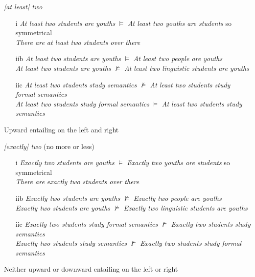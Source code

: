 \documentclass[a4paper]{article}
\begin{document}
\begin{enumerate}
\begin{exe}
    \ex \textit{{[at least]} two}
   \begin{itemize}
    \item[i] \textit{At least two students are youths} $\models$
      \textit{At least two youths are students} so symmetrical
      \\ \textit{There are at least two students over there}
    \item[iib] \textit{At least two students are youths}  $\models$
      \textit{At least two people are youths}
     \\  \textit{At least two students are youths}  $\not\models$
     \textit{At least two linguistic students are youths}
       \item[iic] \textit{At least two students study semantics}  $\not\models$
      \textit{At least two students study formal semantics}
     \\  \textit{At least two students study  formal semantics}  $\models$
      \textit{At least two students study semantics} 
    \end{itemize}
       Upward  entailing on the left and right
    
    \ex \textit{{[exactly]} two} (no more or less)
    \begin{itemize}
    \item[i] \textit{Exactly two students are youths} $\models$
      \textit{Exactly two youths are students} so symmetrical
      \\ \textit{There are exactly two students over there}
    \item[iib] \textit{Exactly two students are youths}  $\not\models$
      \textit{Exactly two people are youths}
     \\  \textit{Exactly two students are youths}  $\not\models$
     \textit{Exactly two linguistic students are youths}
       \item[iic] \textit{Exactly two students study formal semantics}  $\not\models$
      \textit{Exactly two students study semantics} 
     \\  \textit{Exactly two students study semantics}  $\not\models$
      \textit{Exactly two students study formal semantics}
    \end{itemize}
    Neither upward or downward entailing on the left or right
    

\end{exe}
\end{enumerate}
\end{document}
